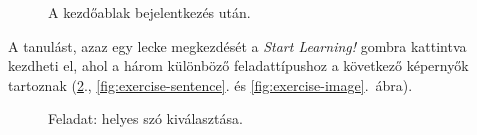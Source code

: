 \documentclass[11pt, a4paper]{article}
\begin{document}
     \begin{figure}[h!]
     	\center
     	\caption{A kezdőablak bejelentkezés után.}
     	\label{fig:after-connect}
     \end{figure}
     A tanulást, azaz egy lecke megkezdését a \emph{Start Learning!} gombra kattintva kezdheti el, ahol a három különböző feladattípushoz a következő képernyők tartoznak (\ref{fig:exercise-word}., \ref{fig:exercise-sentence}. és \ref{fig:exercise-image}.~ábra).
     \begin{figure}[h!]
     	\center
     	\caption{Feladat: helyes szó kiválasztása.}
     	\label{fig:exercise-word}
     \end{figure}
\end{document}
